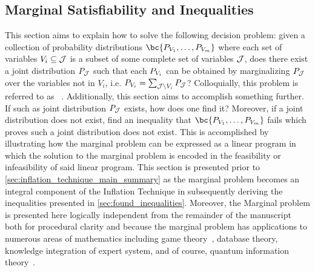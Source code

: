 \documentclass[aps, 10pt, english, twoside, pra, nofootinbib, tightenlines, longbibliography, superscriptaddress]{revtex4-1}
\begin{document}
    \subsection{Marginal Satisfiability and Inequalities}
    \label{sec:marginal_satisfiability}
    \label{sec:marginal_linear}\label{sec:linear_programs}

    This section aims to explain how to solve the following decision problem: given a collection of probability distributions $\bc{\prob[V_1], \ldots, \prob[V_m]}$ where each set of variables $V_{i} \subseteq \mathcal{J}$ is a subset of some complete set of variables $\mathcal{J}$, does there exist a joint distribution $\prob[\jointvar]$ such that each $\prob[V_i]$ can be obtained by marginalizing $\prob[\jointvar]$ over the variables not in $V_i$, i.e. $\prob[V_i] = \sum_{\jointvar \setminus V_i} \prob[\jointvar]$? Colloquially, this problem is referred to as ~\cite{Fritz_2011}. Additionally, this section aims to accomplish something further. If such as joint distribution $\prob[\jointvar]$ exists, how does one find it? Moreover, if a joint distribution does not exist, find an inequality that $\bc{\prob[V_1], \ldots, \prob[V_m]}$ fails which proves such a joint distribution does not exist. This is accomplished by illustrating how the marginal problem can be expressed as a linear program in which the solution to the marginal problem is encoded in the feasibility or infeasibility of said linear program. This section is presented prior to \cref{sec:inflation_technique_main_summary} as the marginal problem becomes an integral component of the Inflation Technique in subsequently deriving the inequalities presented in \cref{sec:found_inequalities}. Moreover, the Marginal problem is presented here logically independent from the remainder of the manuscript both for procedural clarity and because the marginal problem has applications to numerous areas of mathematics including game theory~\cite{Vorobev_1962}, database theory, knowledge integration of expert system, and of course, quantum information theory~\cite{Fritz_2011}.
\end{document}
